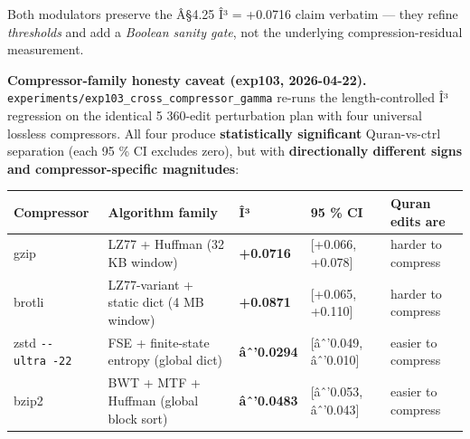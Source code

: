 \documentclass[
]{article}
\newcounter{none} %
\begin{document}
Both modulators preserve the Â§4.25 Î³ = +0.0716 claim verbatim --- they
refine \emph{thresholds} and add a \emph{Boolean sanity gate}, not the
underlying compression-residual measurement.

\textbf{Compressor-family honesty caveat (exp103, 2026-04-22).}
\texttt{experiments/exp103\_cross\_compressor\_gamma} re-runs the
length-controlled Î³ regression on the identical 5 360-edit perturbation
plan with four universal lossless compressors. All four produce
\textbf{statistically significant} Quran-vs-ctrl separation (each 95 \%
CI excludes zero), but with \textbf{directionally different signs and
compressor-specific magnitudes}:

{\def\LTcaptype{none} %
\begin{longtable}[]{@{}
  >{\raggedright\arraybackslash}p{}
  >{\raggedright\arraybackslash}p{}
  >{\raggedleft\arraybackslash}p{}
  >{\raggedright\arraybackslash}p{}
  >{\raggedright\arraybackslash}p{}@{}}
\toprule\noalign{}
\begin{minipage}[b]{\linewidth}\raggedright
Compressor
\end{minipage} & \begin{minipage}[b]{\linewidth}\raggedright
Algorithm family
\end{minipage} & \begin{minipage}[b]{\linewidth}\raggedleft
Î³
\end{minipage} & \begin{minipage}[b]{\linewidth}\raggedright
95 \% CI
\end{minipage} & \begin{minipage}[b]{\linewidth}\raggedright
Quran edits are
\end{minipage} \\
\midrule\noalign{}
\endhead
\bottomrule\noalign{}
\endlastfoot
gzip & LZ77 + Huffman (32 KB window) & \textbf{+0.0716} & {[}+0.066,
+0.078{]} & harder to compress \\
brotli & LZ77-variant + static dict (4 MB window) & \textbf{+0.0871} &
{[}+0.065, +0.110{]} & harder to compress \\
zstd \texttt{-\/-ultra\ -22} & FSE + finite-state entropy (global dict)
& \textbf{âˆ'0.0294} & {[}âˆ'0.049, âˆ'0.010{]} & easier to compress \\
bzip2 & BWT + MTF + Huffman (global block sort) & \textbf{âˆ'0.0483} &
{[}âˆ'0.053, âˆ'0.043{]} & easier to compress \\
\end{longtable}
}
\end{document}
